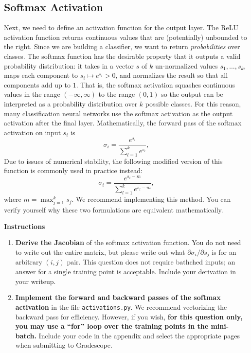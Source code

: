 \documentclass{article}
\begin{document}
\subsection{Softmax Activation}
Next, we need to define an activation function for the output layer. 
The ReLU activation function returns continuous values that are (potentially) unbounded to the right. 
Since we are building a classifier, we want to return \textit{probabilities} over classes. 
The softmax function has the desirable property that it outputs a valid probability distribution: it takes in a vector $s$ of $k$ un-normalized values $s_1, \ldots, s_k$, maps each component to $s_i \mapsto e^{s_i} > 0$, and normalizes the result so that all components add up to $1$. 
That is, the softmax activation squashes continuous values in the range $(-\infty, \infty)$ to the range $(0, 1)$ so the output can be interpreted as a probability distribution over $k$ possible classes. 
For this reason, many classification neural networks use the softmax activation as the output activation after the final layer. 
Mathematically, the forward pass of the softmax activation on input $s_i$ is 
\[
    \sigma_i = \frac{e^{s_i}}{\sum_{l=1}^{k} e^{s_l}},
\]
Due to issues of numerical stability, the following modified version of this function is commonly used in practice instead:
\[
    \sigma_i = \frac{e^{s_i - m}}{\sum_{l=1}^{k} e^{s_l-m}},
\]
where $m = \max_{j=1}^k s_j$. 
We recommend implementing this method. 
You can verify yourself why these two formulations are equivalent mathematically.

\textbf{Instructions}
\begin{enumerate}
    \item 
    \textbf{Derive the Jacobian} of the softmax activation function. 
    You do not need to write out the entire matrix, but please write out what $\partial \sigma_i/\partial s_j$ is for an arbitrary $(i, j)$ pair. 
    This question does not require bathched inputs; an answer for a single training point is acceptable. 
    Include your derivation in your writeup.

    \item 
    \textbf{Implement the forward and backward passes of the softmax activation} in the file \texttt{activations.py}. 
    We recommend vectorizing the backward pass for efficiency. 
    However, if you wish, \textbf{for this question only, you may use a ``for'' loop over the training points in the mini-batch.} 
    Include your code in the appendix and select the appropriate pages when submitting to Gradescope.
\end{enumerate}
\end{document}
